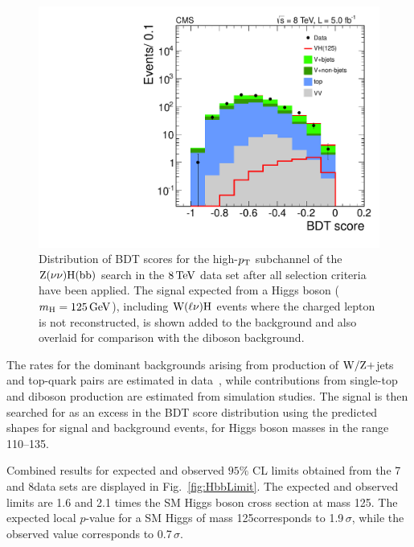 \documentclass[11pt,twoside,a4paper,cmspaper,final]{cms-tdr}
\begin{document}
\begin{figure}[htbp]
  \begin{center}
    \includegraphics[width=\cmsFigWideWidth]{ZnnHighPt8TeVNoRatioVersionAnoMCUnc}
    \caption{Distribution of BDT scores for the high-$p_{\mathrm{T}}$ subchannel of the  $\mathrm{Z}(\nu\nu)\mathrm{H}(\mathrm{b}\mathrm{b})$ search in the $8\,\text{Te\hspace{-.08em}V}$ data set after all selection  criteria have been applied.
The signal expected from a Higgs boson ($m_{\mathrm{H}} = 125\,\text{Ge\hspace{-.08em}V}$), including $\mathrm{W}(\ell\nu)\mathrm{H}$ events where the charged lepton is not  reconstructed, is shown added to the background and also overlaid for comparison with the diboson background.}
    \label{fig:HbbBDT}
  \end{center}
\end{figure}

The rates for the dominant backgrounds arising from production of
$\mathrm{W}/\mathrm{Z}+$jets and top-quark pairs are estimated in data~\cite{Chatrchyan:2012ww}, while
contributions from single-top and diboson production are estimated from
simulation studies.
The signal is then searched for as an excess in
the BDT score distribution using
the predicted shapes for signal and background events, for Higgs
boson masses in the range 110--135\GeV.

Combined results for expected and observed $95\%$ CL limits
obtained from the 7 and 8\TeV data sets are displayed in
Fig.~\ref{fig:HbbLimit}. The expected and observed limits are 1.6 and 2.1 times
the SM Higgs boson cross section at mass 125\GeV.
The  expected local $p$-value for a SM Higgs of mass
125\GeV corresponds to 1.9$\,\sigma$, while the observed value corresponds to 0.7$\,\sigma$.
\end{document}
